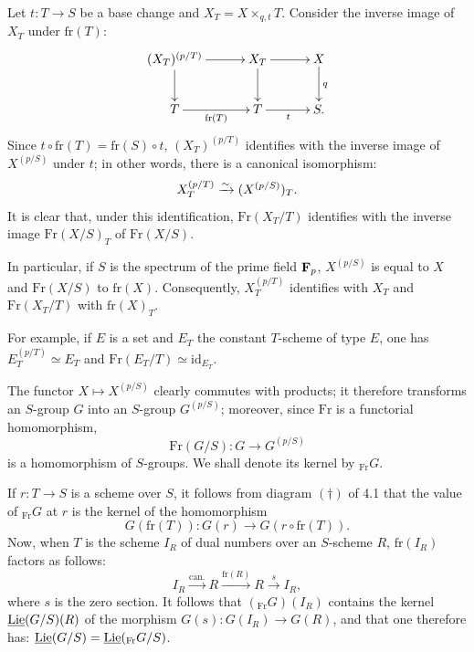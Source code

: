 Let $t:T\to S$ be a base change and $X_T=X\times_{q,t}T$. Consider the inverse image of $X_T$ under $\mathrm{fr}(T)$:
\[
\xymatrix@C=3em{(X_T)^{(p/T)}\ar[r]\ar[d]&X_T\ar[r]\ar[d]&X\ar[d]^q\\
T\ar[r]_{\mathrm{fr}(T)}&T\ar[r]_t&S.}
\]
Since $t\circ\mathrm{fr}(T)=\mathrm{fr}(S)\circ t$, $(X_T)^{(p/T)}$ identifies with the inverse image of $X^{(p/S)}$ under $t$; in other words, there is a canonical isomorphism:
\[
X_T^{(p/T)}\xrightarrow{\sim}(X^{(p/S)})_T.
\]
It is clear that, under this identification, $\mathrm{Fr}(X_T/T)$ identifies with the inverse image $\mathrm{Fr}(X/S)_T$ of $\mathrm{Fr}(X/S)$.

In particular, if $S$ is the spectrum of the prime field $\mathbf{F}_p$, $X^{(p/S)}$ is equal to $X$ and $\mathrm{Fr}(X/S)$ to $\mathrm{fr}(X)$. Consequently, $X_T^{(p/T)}$ identifies with $X_T$ and $\mathrm{Fr}(X_T/T)$ with $\mathrm{fr}(X)_T$.

For example, if $E$ is a set and $E_T$ the constant $T$-scheme of type $E$, one has $E_T^{(p/T)}\simeq E_T$ and $\mathrm{Fr}(E_T/T)\simeq\mathrm{id}_{E_T}$.

The functor $X\mapsto X^{(p/S)}$ clearly commutes with products; it therefore transforms an $S$-group $G$ into an $S$-group $G^{(p/S)}$; moreover, since $\mathrm{Fr}$ is a functorial homomorphism,
\[
\mathrm{Fr}(G/S):G\longrightarrow G^{(p/S)}
\]
is a homomorphism of $S$-groups. We shall denote its kernel by ${}_{\mathrm{Fr}}G$.

If $r:T\to S$ is a scheme over $S$, it follows from diagram $(\dagger)$ of 4.1 that the value of ${}_{\mathrm{Fr}}G$ at $r$ is the kernel of the homomorphism
\[
G(\mathrm{fr}(T)):G(r)\longrightarrow G(r\circ\mathrm{fr}(T)).
\]
Now, when $T$ is the scheme $I_R$ of dual numbers over an $S$-scheme $R$, $\mathrm{fr}(I_R)$ factors as follows:
\[
I_R\xrightarrow{\mathrm{can.}}R\xrightarrow{\mathrm{fr}(R)}R\xrightarrow{s}I_R,
\]
where $s$ is the zero section. It follows that $({}_{\mathrm{Fr}}G)(I_R)$ contains the kernel $\underline{\operatorname{Lie}}(G/S)(R)$ of the morphism $G(s):G(I_R)\to G(R)$, and that one therefore has: $\underline{\operatorname{Lie}}(G/S)=\underline{\operatorname{Lie}}({}_{\mathrm{Fr}}G/S)$.
